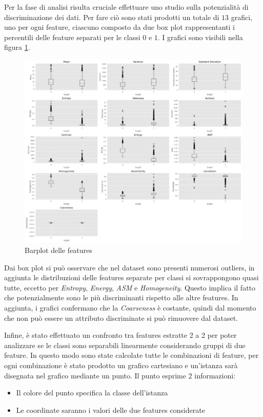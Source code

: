 Per la fase di analisi risulta cruciale effettuare uno studio sulla potenzialità
di discriminazione dei dati. Per fare ciò sono stati prodotti un totale di $13$
grafici, uno per ogni feature, ciascuno composto da due box plot rappresentanti
i percentili delle feature separati per le classi $0$ e $1$. I grafici sono visibili
nella figura \ref{fig:boxplot_features}.
\newpage
\begin{figure}[!ht]
      \centering
      \includegraphics[width=\textwidth]{img/analisi/boxplot.png}
      \caption{Barplot delle features}
      \label{fig:boxplot_features}
\end{figure}

Dai box plot si può osservare che nel dataset sono presenti numerosi outliers, in
aggiunta le distribuzioni delle features separate per classi si sovrappongono
quasi tutte, eccetto per \textit{Entropy}, \textit{Energy}, \textit{ASM} e
\textit{Homogeneity}. Questo implica il fatto che potenzialmente sono le più
discriminanti rispetto alle altre features. In aggiunta, i grafici confermano
che la \textit{Coarseness} è costante, quindi dal momento che non può essere un
attributo discriminate si può rimuovere dal dataset.

Infine, è stato effettuato un confronto tra features estratte 2 a 2 per poter
analizzare se le classi sono separabili linearmente considerando gruppi di due
feature. In questo modo sono state calcolate tutte le combinazioni di feature,
per ogni combinazione è stato prodotto un grafico cartesiano e un'istanza sarà
disegnata nel grafico mediante un punto. Il punto esprime $2$ informazioni:
\begin{itemize}
      \item Il colore del punto specifica la classe dell'istanza
      \item Le coordinate saranno i valori delle due features considerate
\end{itemize}

